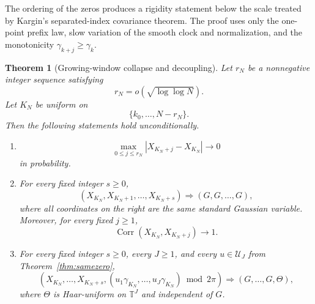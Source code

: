 \documentclass[pdflatex,sn-mathphys-num]{sn-jnl}
\numberwithin{equation}{section}
\theoremstyle{thmstyleone}
\newtheorem{theorem}{Theorem}[section]
\theoremstyle{thmstylethree}
\theoremstyle{thmstyletwo}
\newcommand{\Torus}{\mathbb T}
\newcommand{\Corr}{\operatorname{Corr}}
\newcommand{\1}{\mathbf 1}
\begin{document}
The ordering of the zeros produces a rigidity statement below the scale treated by Kargin's
separated-index covariance theorem.  The proof uses only the one-point prefix law, slow variation
of the smooth clock and normalization, and the monotonicity $\gamma_{k+j}\ge\gamma_k$.

\begin{theorem}[Growing-window collapse and decoupling]
\label{thm:growing_window}
Let $r_N$ be a nonnegative integer sequence satisfying
\begin{equation}
 r_N=o\!\left(\sqrt{\log\log N}\right).
\label{eq:r_window}
\end{equation}
Let $K_N$ be uniform on
\[
 \{k_0,\ldots,N-r_N\}.
\]
Then the following statements hold unconditionally.

\begin{enumerate}[label=\textup{(\roman*)}]
\item
\begin{equation}
 \max_{0\le j\le r_N}|X_{K_N+j}-X_{K_N}|
 \longrightarrow0
\label{eq:window_rigidity}
\end{equation}
in probability.

\item For every fixed integer $s\ge0$,
\begin{equation}
 (X_{K_N},X_{K_N+1},\ldots,X_{K_N+s})
 \Longrightarrow
 (G,G,\ldots,G),
\label{eq:fixed_window_diagonal}
\end{equation}
where all coordinates on the right are the same standard Gaussian variable.  Moreover, for every
fixed $j\ge1$,
\begin{equation}
 \Corr(X_{K_N},X_{K_N+j})\longrightarrow1.
\label{eq:fixed_lag_corr}
\end{equation}

\item For every fixed integer $s\ge0$, every $J\ge1$, and every $u\in\mathcal U_J$ from
Theorem~\ref{thm:samezero},
\begin{equation}
 \left(
 X_{K_N},\ldots,X_{K_N+s},
 (u_1\gamma_{K_N},\ldots,u_J\gamma_{K_N})\bmod2\pi
 \right)
 \Longrightarrow
 (G,\ldots,G,\Theta),
\label{eq:window_phase_decoupling}
\end{equation}
where $\Theta$ is Haar-uniform on $\Torus^J$ and independent of $G$.
\end{enumerate}
\end{theorem}
\end{document}
